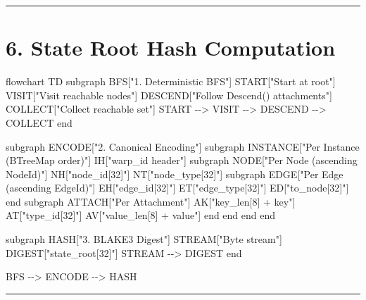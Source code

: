 \documentclass[
]{book}
\newenvironment{Shaded}{}{}
\newcommand{\NormalTok}[1]{#1}
\begin{document}
\begin{center}\rule{0.5\linewidth}{0.5pt}\end{center}

\section{6. State Root Hash
Computation}\label{state-root-hash-computation}

\begin{Shaded}
\begin{Highlighting}[]
\NormalTok{flowchart TD}
\NormalTok{    subgraph BFS["1. Deterministic BFS"]}
\NormalTok{        START["Start at root"]}
\NormalTok{        VISIT["Visit reachable nodes"]}
\NormalTok{        DESCEND["Follow Descend() attachments"]}
\NormalTok{        COLLECT["Collect reachable set"]}
\NormalTok{        START {-}{-}\textgreater{} VISIT {-}{-}\textgreater{} DESCEND {-}{-}\textgreater{} COLLECT}
\NormalTok{    end}

\NormalTok{    subgraph ENCODE["2. Canonical Encoding"]}
\NormalTok{        subgraph INSTANCE["Per Instance (BTreeMap order)"]}
\NormalTok{            IH["warp\_id header"]}
\NormalTok{            subgraph NODE["Per Node (ascending NodeId)"]}
\NormalTok{                NH["node\_id[32]"]}
\NormalTok{                NT["node\_type[32]"]}
\NormalTok{                subgraph EDGE["Per Edge (ascending EdgeId)"]}
\NormalTok{                    EH["edge\_id[32]"]}
\NormalTok{                    ET["edge\_type[32]"]}
\NormalTok{                    ED["to\_node[32]"]}
\NormalTok{                end}
\NormalTok{                subgraph ATTACH["Per Attachment"]}
\NormalTok{                    AK["key\_len[8] + key"]}
\NormalTok{                    AT["type\_id[32]"]}
\NormalTok{                    AV["value\_len[8] + value"]}
\NormalTok{                end}
\NormalTok{            end}
\NormalTok{        end}
\NormalTok{    end}

\NormalTok{    subgraph HASH["3. BLAKE3 Digest"]}
\NormalTok{        STREAM["Byte stream"]}
\NormalTok{        DIGEST["state\_root[32]"]}
\NormalTok{        STREAM {-}{-}\textgreater{} DIGEST}
\NormalTok{    end}

\NormalTok{    BFS {-}{-}\textgreater{} ENCODE {-}{-}\textgreater{} HASH}
\end{Highlighting}
\end{Shaded}

\begin{center}\rule{0.5\linewidth}{0.5pt}\end{center}
\end{document}
